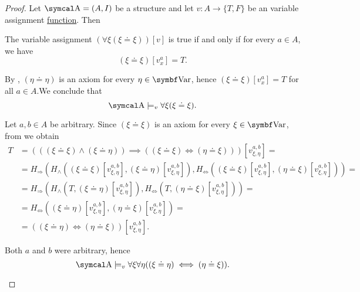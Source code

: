 \begin{proof}
  Let \( \CA = (A, I) \) be a structure and let \( v: A \to \{ T, F \} \) be an variable assignment \hyperref[def:first_order_variable_assignment]{function}. Then

  \begin{description}
     The variable assignment \( (\forall \xi (\xi \doteq \xi))[v] \) is true if and only if for every \( a \in A \), we have
    \begin{equation*}
      (\xi \doteq \xi)[v_x^a] = T.
    \end{equation*}

    By , \( (\eta \doteq \eta) \) is an axiom for every \( \eta \in \Bold{Var} \), hence \mbox{\( (\xi \doteq \xi)[v_x^a] = T \)} for all \( a \in A \).We conclude that
    \begin{equation*}
      \CA \models_v \forall \xi (\xi \doteq \xi).
    \end{equation*}

     Let \( a, b \in A \) be arbitrary. Since \( (\xi \doteq \xi) \) is an axiom for every \( \xi \in \Bold{Var} \), from  we obtain
    \begin{align*}
      T &=
      (((\xi \doteq \xi) \land (\xi \doteq \eta)) \implies ((\xi \doteq \xi) \iff (\eta \doteq \xi)))[v_{\xi,\eta}^{a,b}]
      = \\ &=
      H_\Rightarrow(H_\land((\xi \doteq \xi)[v_{\xi,\eta}^{a,b}], (\xi \doteq \eta)[v_{\xi,\eta}^{a,b}]), H_\Leftrightarrow((\xi \doteq \xi)[v_{\xi,\eta}^{a,b}], (\eta \doteq \xi)[v_{\xi,\eta}^{a,b}]))
      = \\ &=
      H_\Rightarrow(H_\land(T, (\xi \doteq \eta)[v_{\xi,\eta}^{a,b}]), H_\Leftrightarrow(T, (\eta \doteq \xi)[v_{\xi,\eta}^{a,b}]))
      = \\ &=
      H_\Leftrightarrow((\xi \doteq \eta)[v_{\xi,\eta}^{a,b}], (\eta \doteq \xi)[v_{\xi,\eta}^{a,b}])
      = \\ &=
      ((\xi \doteq \eta) \iff (\eta \doteq \xi))[v_{\xi,\eta}^{a,b}].
    \end{align*}

    Both \( a \) and \( b \) were arbitrary, hence
    \begin{equation*}
      \CA \models_v \forall \xi \forall \eta ((\xi \doteq \eta) \iff (\eta \doteq \xi)).
    \end{equation*}


\end{description}
\end{proof}
